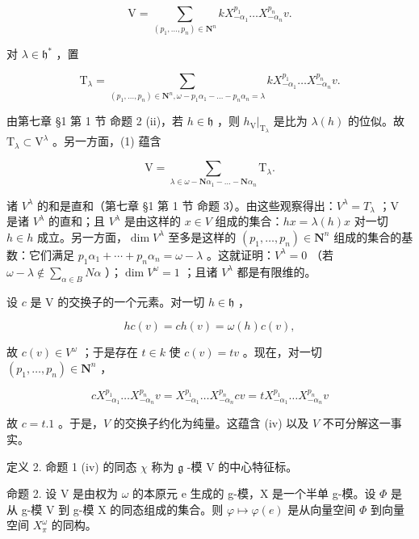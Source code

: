 \[
\mathrm{V} = \sum_ {(p _ {1}, \dots , p _ {n}) \in \mathbf {N} ^ {n}} k X _ {- \alpha_ {1}} ^ {p _ {1}} \dots X _ {- \alpha_ {n}} ^ {p _ {n}} v.\tag{1}
\]

对 \(\lambda \in \mathfrak{h}^*\) ，置

\[
\mathrm{T} _ {\lambda} = \sum_ {(p _ {1}, \ldots , p _ {n}) \in \mathbf {N} ^ {n}, \omega - p _ {1} \alpha_ {1} - \dots - p _ {n} \alpha_ {n} = \lambda} k X _ {- \alpha_ {1}} ^ {p _ {1}} \ldots X _ {- \alpha_ {n}} ^ {p _ {n}} v.
\]

由第七章 §1 第 1 节 命题 2 (ii)，若 \(h \in \mathfrak{h}\) ，则 \(h_{\mathrm{V}}|_{\mathrm{T}_{\lambda}}\) 是比为 \(\lambda(h)\) 的位似。故 \(\mathrm{T}_{\lambda} \subset \mathrm{V}^{\lambda}\) 。另一方面，(1) 蕴含

\[
\mathrm{V} = \sum_ {\lambda \in \omega - \mathbf {N} \alpha_ {1} - \dots - \mathbf {N} \alpha_ {n}} \mathrm{T} _ {\lambda}.
\]

诸 \(V^{\lambda}\) 的和是直和（第七章 §1 第 1 节 命题 3）。由这些观察得出：\(V^{\lambda} = T_{\lambda}\) ；V 是诸 \(V^{\lambda}\) 的直和；且 \(V^{\lambda}\) 是由这样的 \(x \in V\) 组成的集合：\(hx = \lambda(h)x\) 对一切 \(h \in h\) 成立。另一方面，\(\dim V^{\lambda}\) 至多是这样的 \((p_{1}, \ldots, p_{n}) \in \mathbf{N}^{n}\) 组成的集合的基数：它们满足 \(p_{1}\alpha_{1} + \cdots + p_{n}\alpha_{n} = \omega - \lambda\) 。这就证明：\(V^{\lambda} = 0\) （若 \(\omega - \lambda \notin \sum_{\alpha \in B} N\alpha\) ）；\(\dim V^{\omega} = 1\) ；且诸 \(V^{\lambda}\) 都是有限维的。

设 \(c\) 是 V 的交换子的一个元素。对一切 \(h \in \mathfrak{h}\) ，

\[
h c (v) = c h (v) = \omega (h) c (v),
\]

故 \(c(v) \in V^{\omega}\) ；于是存在 \(t \in k\) 使 \(c(v) = tv\) 。现在，对一切 \((p_1, \ldots, p_n) \in \mathbf{N}^n\) ，

\[
c X _ {- \alpha_ {1}} ^ {p _ {1}} \dots X _ {- \alpha_ {n}} ^ {p _ {n}} v = X _ {- \alpha_ {1}} ^ {p _ {1}} \dots X _ {- \alpha_ {n}} ^ {p _ {n}} c v = t X _ {- \alpha_ {1}} ^ {p _ {1}} \dots X _ {- \alpha_ {n}} ^ {p _ {n}} v
\]

故 \(c = t.1\) 。于是，\(V\) 的交换子约化为纯量。这蕴含 (iv) 以及 \(V\) 不可分解这一事实。

定义 2. 命题 1 (iv) 的同态 \(\chi\) 称为 \(\mathfrak{g}\) -模 V 的中心特征标。

命题 2. 设 V 是由权为 \(\omega\) 的本原元 e 生成的 g-模，X 是一个半单 g-模。设 \(\Phi\) 是从 g-模 V 到 g-模 X 的同态组成的集合。则 \(\varphi\mapsto\varphi(e)\) 是从向量空间 \(\Phi\) 到向量空间 \(X_{\pi}^{\omega}\) 的同构。

